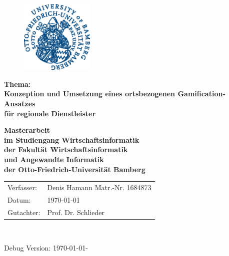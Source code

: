 \begin{titlepage}
\begin{figure}[H]
\begin{center}
\includegraphics[width=35mm]{images/deckblatt_logo.eps}
\end{center}
\end{figure}

{\sffamily
\begin{center}
	\bfseries
	\Large {Thema:\\Konzeption und Umsetzung eines ortsbezogenen Gamification-Ansatzes\\
	für regionale Dienstleister}
\end{center}
\vspace{1cm}
\begin{center}

	{\Large\bfseries Masterarbeit\\}
	{\normalsize\bfseries im Studiengang Wirtschaftsinformatik\\}
	{\normalsize\bfseries der Fakultät Wirtschaftsinformatik\\}
	{\normalsize\bfseries und Angewandte Informatik\\}
	{\normalsize\bfseries der Otto-Friedrich-Universität Bamberg\\}
	\vspace*{2cm}

\end{center}
}
{\sffamily
\vspace*{3cm}
\begin{large}

\begin{tabular}{ll}
		Verfasser: & Denis Hamann \hspace*{2cm} Matr.-Nr. 1684873 \\
		Datum: & \today\\
		Gutachter: & Prof. Dr. Schlieder\\


\end{tabular}\\[0.5cm]

\end{large}
{\footnotesize Debug Version: \today  - \currenttime}

}

\end{titlepage}
